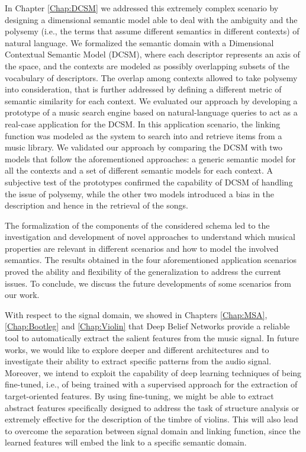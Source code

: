 In Chapter \ref{Chap:DCSM} we addressed this extremely complex scenario by designing a dimensional semantic model able to deal with the ambiguity and the polysemy (i.e., the terms that assume different semantics in different contexts) of natural language. We formalized the semantic domain with a Dimensional Contextual Semantic Model (DCSM), where each descriptor represents an axis of the space, and the contexts are modeled as possibly overlapping subsets of the vocabulary of descriptors. 
The overlap among contexts allowed to take polysemy into consideration, that is further addressed by defining a different metric of semantic similarity for each context. We evaluated our approach by developing a prototype of a music search engine based on natural-language queries to act as a real-case application for the DCSM. In this application scenario, the linking function was modeled as the system to search into and retrieve items from a music library. We validated our approach by comparing the DCSM with two models that follow the aforementioned approaches: a generic semantic model for all the contexts and a set of different semantic models for each context. A subjective test of the prototypes confirmed the capability of DCSM of handling the issue of polysemy, while the other two models introduced a bias in the description and hence in the retrieval of the songs. 


The formalization of the components of the considered schema led to the investigation and development of novel approaches to understand which musical properties are relevant in different scenarios and how to model the involved semantics. The results obtained in the four aforementioned application scenarios proved the ability and flexibility of the generalization to address the current issues. To conclude, we discuss the future developments of some scenarios from our work. 

With respect to the signal domain, we showed in Chapters \ref{Chap:MSA}, \ref{Chap:Bootleg} and \ref{Chap:Violin} that Deep Belief Networks provide a reliable tool to automatically extract the salient features from the music signal. In future works, we would like to explore deeper and different architectures and to investigate their ability to extract specific patterns from the audio signal. Moreover, we intend to exploit the capability of deep learning techniques of being fine-tuned, i.e., of being trained with a supervised approach for the extraction of target-oriented features. By using fine-tuning, we might be able to extract abstract features specifically designed to address the task of structure analysis or extremely effective for the description of the timbre of violins. This will also lead to overcome the separation between signal domain and linking function, since the learned features will embed the link to a specific semantic domain.

